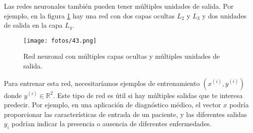 Las redes neuronales también pueden tener múltiples unidades de salida. Por ejemplo, en la figura \ref{fig:7.4} hay una red con dos capas ocultas $L_2$ y $L_3$ y dos unidades de salida en la capa $L_4$.

\begin{figure}[h]
\centering
\texttt{[image: fotos/43.png]}
\caption{Red neuronal con múltiples capas ocultas y múltiples unidades de salida.}
\label{fig:7.4}
\end{figure}

Para entrenar esta red, necesitaríamos ejemplos de entrenamiento $(x^{(i)}, y^{(i)})$ donde $y^{(i)} \in \mathbb{R}^2$. Este tipo de red es útil si hay múltiples salidas que te interesa predecir. Por ejemplo, en una aplicación de diagnóstico médico, el vector $x$ podría proporcionar las características de entrada de un paciente, y las diferentes salidas $y_i$ podrían indicar la presencia o ausencia de diferentes enfermedades. \\

